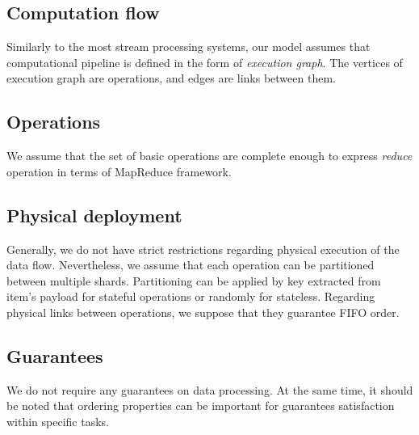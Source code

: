 \subsection{Computation flow}
Similarly to the most stream processing systems, our model assumes that computational pipeline is defined in the form of {\it execution graph}. The vertices of execution graph are operations, and edges are links between them. 

\subsection{Operations}
We assume that the set of basic operations are complete enough to express {\it reduce} operation in terms of MapReduce framework.

\subsection{Physical deployment}
Generally, we do not have strict restrictions regarding physical execution of the data flow. Nevertheless, we assume that each operation can be partitioned between multiple shards. Partitioning can be applied by key extracted from item's payload for stateful operations or randomly for stateless. Regarding physical links between operations, we suppose that they guarantee FIFO order.

\subsection{Guarantees}
We do not require any guarantees on data processing. At the same time, it should be noted that ordering properties can be important for guarantees satisfaction within specific tasks.